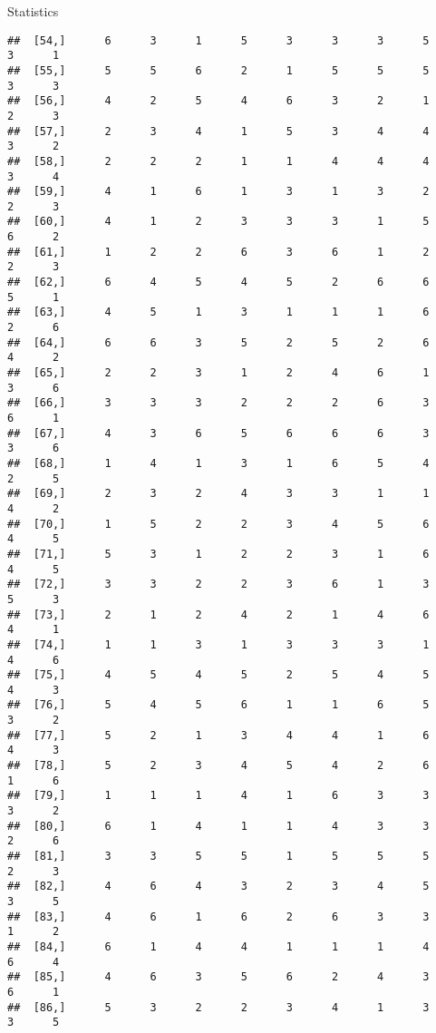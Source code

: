 \documentclass[
  ignorenonframetext,
]{beamer}
\begin{document}
\begin{frame}[fragile]{Statistics}
\begin{verbatim}
##  [54,]      6      3      1      5      3      3      3      5      3      1
##  [55,]      5      5      6      2      1      5      5      5      3      3
##  [56,]      4      2      5      4      6      3      2      1      2      3
##  [57,]      2      3      4      1      5      3      4      4      3      2
##  [58,]      2      2      2      1      1      4      4      4      3      4
##  [59,]      4      1      6      1      3      1      3      2      2      3
##  [60,]      4      1      2      3      3      3      1      5      6      2
##  [61,]      1      2      2      6      3      6      1      2      2      3
##  [62,]      6      4      5      4      5      2      6      6      5      1
##  [63,]      4      5      1      3      1      1      1      6      2      6
##  [64,]      6      6      3      5      2      5      2      6      4      2
##  [65,]      2      2      3      1      2      4      6      1      3      6
##  [66,]      3      3      3      2      2      2      6      3      6      1
##  [67,]      4      3      6      5      6      6      6      3      3      6
##  [68,]      1      4      1      3      1      6      5      4      2      5
##  [69,]      2      3      2      4      3      3      1      1      4      2
##  [70,]      1      5      2      2      3      4      5      6      4      5
##  [71,]      5      3      1      2      2      3      1      6      4      5
##  [72,]      3      3      2      2      3      6      1      3      5      3
##  [73,]      2      1      2      4      2      1      4      6      4      1
##  [74,]      1      1      3      1      3      3      3      1      4      6
##  [75,]      4      5      4      5      2      5      4      5      4      3
##  [76,]      5      4      5      6      1      1      6      5      3      2
##  [77,]      5      2      1      3      4      4      1      6      4      3
##  [78,]      5      2      3      4      5      4      2      6      1      6
##  [79,]      1      1      1      4      1      6      3      3      3      2
##  [80,]      6      1      4      1      1      4      3      3      2      6
##  [81,]      3      3      5      5      1      5      5      5      2      3
##  [82,]      4      6      4      3      2      3      4      5      3      5
##  [83,]      4      6      1      6      2      6      3      3      1      2
##  [84,]      6      1      4      4      1      1      1      4      6      4
##  [85,]      4      6      3      5      6      2      4      3      6      1
##  [86,]      5      3      2      2      3      4      1      3      3      5

\end{verbatim}
\end{frame}
\end{document}
